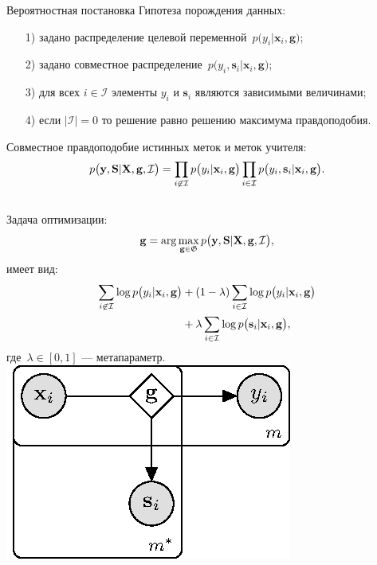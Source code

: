 \documentclass[10pt,pdf,hyperref={unicode}]{beamer}
\begin{document}
\begin{frame}{Вероятностная постановка}
\justifying
Гипотеза порождения данных:
\begin{enumerate}
	\item[1)] задано распределение целевой переменной~$p\bigr(y_i|\mathbf{x}_i, \mathbf{g}\bigr)$;
	\item[2)] задано совместное распределение~$p\bigr(y_i, \mathbf{s}_i|\mathbf{x}_i, \mathbf{g}\bigr)$;
	\item[3)] для всех $i \in \mathcal{I}$ элементы $y_i$ и $\mathbf{s}_i$ являются зависимыми величинами;
	\item[4)] если $|\mathcal{I}|=0$ то решение равно решению максимума правдоподобия.
\end{enumerate}
Совместное правдоподобие истинных меток и меток учителя:
\[
\setlength\abovedisplayskip{0pt}
p\bigr(\mathbf{y}, \mathbf{S}|\mathbf{X}, \mathbf{g}, \mathcal{I}\bigr)=\prod_{i\not\in \mathcal{I}}p\bigr(y_i|\mathbf{x}_i, \mathbf{g}\bigr)\prod_{i\in \mathcal{I}}p\bigr(y_i, \mathbf{s}_i|\mathbf{x}_i, \mathbf{g}\bigr).
\setlength\belowdisplayskip{0pt}
\]

\begin{columns}
Задача оптимизации:
\[
\setlength\abovedisplayskip{0pt}
\mathbf{g} = \arg\max_{\mathbf{g} \in \mathfrak{G}} p\bigr(\mathbf{y}, \mathbf{S}|\mathbf{X}, \mathbf{g}, \mathcal{I}\bigr),
\setlength\belowdisplayskip{0pt}
\]
имеет вид:
\[
\setlength\abovedisplayskip{0pt}
\begin{aligned}
\sum_{i\not\in \mathcal{I}}\log p\bigr(y_i|\mathbf{x}_i, \mathbf{g}\bigr) &+ \left(1-\lambda\right)\sum_{i\in \mathcal{I}}\log p\bigr(y_i|\mathbf{x}_i, \mathbf{g}\bigr) \\
&+ \lambda\sum_{i\in \mathcal{I}}\log p\bigr(\mathbf{s}_i|\mathbf{x}_i, \mathbf{g}\bigr),
\end{aligned}
\setlength\belowdisplayskip{0pt}
\]
где~$\lambda \in [0,1]$ --- метапараметр.
\includegraphics[width=\textwidth]{figures/proba_model}
\end{columns}

\end{frame}
\end{document}
